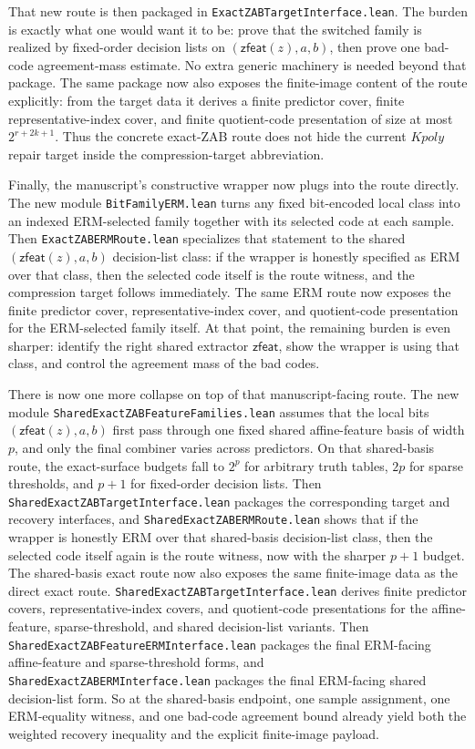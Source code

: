 \documentclass[11pt]{article}
\theoremstyle{remark}
\begin{document}
That new route is then packaged in \texttt{ExactZABTargetInterface.lean}.  The
burden is exactly what one would want it to be: prove that the switched family
is realized by fixed-order decision lists on \((\mathsf{zfeat}(z),a,b)\), then
prove one bad-code agreement-mass estimate.  No extra generic machinery is
needed beyond that package.  The same package now also exposes the finite-image
content of the route explicitly: from the target data it derives a finite
predictor cover, finite representative-index cover, and finite quotient-code
presentation of size at most \(2^{r+2k+1}\).  Thus the concrete exact-ZAB route
does not hide the current \(Kpoly\) repair target inside the compression-target
abbreviation.

Finally, the manuscript's constructive wrapper now plugs into the route
directly.  The new module \texttt{BitFamilyERM.lean} turns any fixed bit-encoded
local class into an indexed ERM-selected family together with its selected code
at each sample.  Then \texttt{ExactZABERMRoute.lean} specializes that statement
to the shared \((\mathsf{zfeat}(z),a,b)\) decision-list class: if the wrapper is
honestly specified as ERM over that class, then the selected code itself is the
route witness, and the compression target follows immediately.  The same ERM
route now exposes the finite predictor cover, representative-index cover, and
quotient-code presentation for the ERM-selected family itself.  At that point,
the remaining burden is even sharper: identify the right shared extractor
\(\mathsf{zfeat}\), show the wrapper is using that class, and control the
agreement mass of the bad codes.

There is now one more collapse on top of that manuscript-facing route.  The new
module \texttt{SharedExactZABFeatureFamilies.lean} assumes that the local bits
\((\mathsf{zfeat}(z),a,b)\) first pass through one fixed shared affine-feature
basis of width \(p\), and only the final combiner varies across predictors.  On
that shared-basis route, the exact-surface budgets fall to \(2^p\) for arbitrary
truth tables, \(2p\) for sparse thresholds, and \(p+1\) for fixed-order
decision lists.  Then \texttt{SharedExactZABTargetInterface.lean} packages the
corresponding target and recovery interfaces, and
\texttt{SharedExactZABERMRoute.lean} shows that if the wrapper is honestly ERM
over that shared-basis decision-list class, then the selected code itself again
is the route witness, now with the sharper \(p+1\) budget.  The shared-basis
exact route now also exposes the same finite-image data as the direct exact
route.  \texttt{SharedExactZABTargetInterface.lean} derives finite predictor
covers, representative-index covers, and quotient-code presentations for the
affine-feature, sparse-threshold, and shared decision-list variants.  Then
\texttt{SharedExactZABFeatureERMInterface.lean} packages the final ERM-facing
affine-feature and sparse-threshold forms, and
\texttt{SharedExactZABERMInterface.lean} packages the final ERM-facing shared
decision-list form.  So at the shared-basis endpoint, one sample assignment,
one ERM-equality witness, and one bad-code agreement bound already yield both
the weighted recovery inequality and the explicit finite-image payload.
\end{document}
